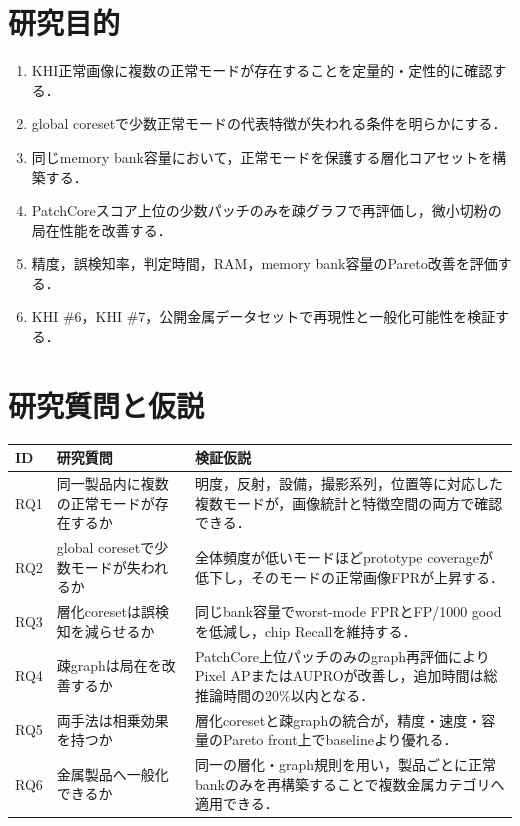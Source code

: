 \documentclass[a4paper,11pt]{ltjsarticle}
\begin{document}
\section{研究目的}
\begin{enumerate}
  \item KHI正常画像に複数の正常モードが存在することを定量的・定性的に確認する．
  \item global coresetで少数正常モードの代表特徴が失われる条件を明らかにする．
  \item 同じmemory bank容量において，正常モードを保護する層化コアセットを構築する．
  \item PatchCoreスコア上位の少数パッチのみを疎グラフで再評価し，微小切粉の局在性能を改善する．
  \item 精度，誤検知率，判定時間，RAM，memory bank容量のPareto改善を評価する．
  \item KHI \#6，KHI \#7，公開金属データセットで再現性と一般化可能性を検証する．
\end{enumerate}

\section{研究質問と仮説}
\begin{longtable}{L{12mm}L{65mm}L{82mm}}
\toprule
ID & 研究質問 & 検証仮説 \\
\midrule
RQ1 & 同一製品内に複数の正常モードが存在するか & 明度，反射，設備，撮影系列，位置等に対応した複数モードが，画像統計と特徴空間の両方で確認できる．\\
RQ2 & global coresetで少数モードが失われるか & 全体頻度が低いモードほどprototype coverageが低下し，そのモードの正常画像FPRが上昇する．\\
RQ3 & 層化coresetは誤検知を減らせるか & 同じbank容量でworst-mode FPRとFP/1000 goodを低減し，chip Recallを維持する．\\
RQ4 & 疎graphは局在を改善するか & PatchCore上位パッチのみのgraph再評価によりPixel APまたはAUPROが改善し，追加時間は総推論時間の20\%以内となる．\\
RQ5 & 両手法は相乗効果を持つか & 層化coresetと疎graphの統合が，精度・速度・容量のPareto front上でbaselineより優れる．\\
RQ6 & 金属製品へ一般化できるか & 同一の層化・graph規則を用い，製品ごとに正常bankのみを再構築することで複数金属カテゴリへ適用できる．\\
\bottomrule
\end{longtable}
\end{document}
